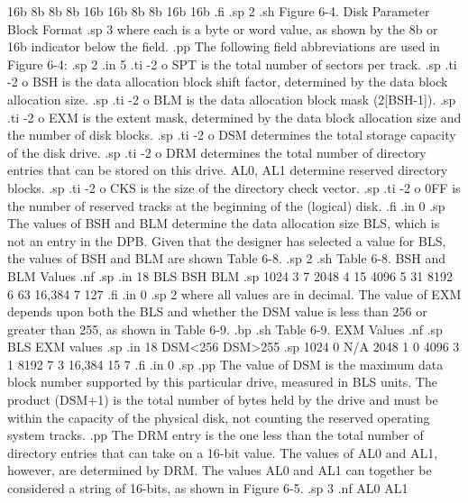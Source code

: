    16b   8b    8b    8b    16b   16b   8b    8b    16b   16b
.fi
.sp 2
.sh
            Figure 6-4.  Disk Parameter Block Format
.sp 3
where each is a byte or word value, as shown by the 8b or 16b indicator below
the field.
.pp
The following field abbreviations are used in Figure 6-4:
.sp 2
.in 5
.ti -2
o SPT is the total number of sectors per track.
.sp
.ti -2
o BSH is the data allocation block shift factor, determined by the data
block allocation size.
.sp
.ti -2
o BLM is the data allocation block mask (2[BSH-1]).
.sp
.ti -2
o EXM is the extent mask, determined by the data block allocation
size and the number of disk blocks.
.sp
.ti -2
o DSM determines the total storage capacity of the disk drive.
.sp
.ti -2
o DRM determines the total number of directory entries that can be
stored on this drive.  AL0, AL1 determine reserved directory blocks.
.sp
.ti -2
o CKS is the size of the directory check vector.
.sp
.ti -2
o 0FF is the number of reserved tracks at the beginning of the
(logical) disk.
.fi
.in 0
.sp
The values of BSH and BLM determine the data allocation size BLS,
which is not an entry in the DPB.  Given that the designer has selected a
value for BLS, the values of BSH and BLM are shown Table 6-8.
.sp 2
.sh
                 Table 6-8.  BSH and BLM Values
.nf
.sp
.in 18
  BLS         BSH         BLM
.sp
  1024         3            7
  2048         4           15
  4096         5           31
  8192         6           63
16,384         7          127
.fi
.in 0
.sp 2
where all values are in decimal.  The value of EXM depends upon both the BLS
and whether the DSM value is less than 256 or greater than 255, as shown in
Table 6-9.
.bp
.sh
                     Table 6-9.  EXM Values
.nf
.sp
                    BLS             EXM values
.sp
.in 18
            DSM<256    DSM>255
.sp
  1024         0         N/A
  2048         1          0
  4096         3          1
  8192         7          3
16,384        15          7
.fi
.in 0
.sp
.pp
The value of DSM is the maximum data block number supported by this
particular drive, measured in BLS units.  The product (DSM+1) is the
total number of bytes held by the drive and must be within the
capacity of the physical disk, not counting the reserved operating system
tracks.
.pp
The DRM entry is the one less than the total number of directory entries
that can take on a 16-bit value.  The values of AL0 and AL1, however, are
determined by DRM.  The values AL0 and AL1 can together be considered a
string of 16-bits, as shown in Figure 6-5.
.sp 3
.nf
                AL0                            AL1

